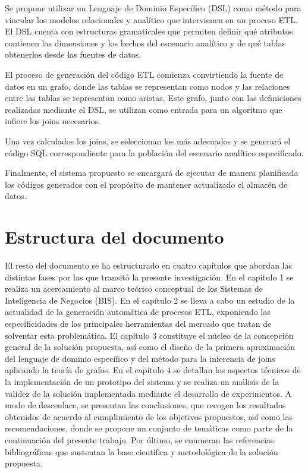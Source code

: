 Se propone utilizar un Lenguaje de Dominio Específico (DSL) como método para vincular los modelos relacionales y analítico
que intervienen en un proceso ETL. El DSL cuenta con estructuras gramaticales que permiten definir qu\'e atributos 
contienen las dimensiones y los hechos del escenario analítico y de qu\'e tablas obtenerlos desde las fuentes de datos.

El proceso de generación del c\'odigo ETL comienza convirtiendo la fuente de datos en un grafo, donde las tablas 
se representan como nodos y las relaciones entre las tablas se representan como aristas. Este grafo, junto con las 
definiciones realizadas mediante el DSL, se utilizan como entrada para un algoritmo que infiere los joins necesarios.

Una vez calculados los joins, se seleccionan los más adecuados y se generará el 
código SQL correspondiente para la población del escenario analítico especificado.

Finalmente, el sistema propuesto se encargará de ejecutar de manera planificada los códigos generados con el propósito de 
mantener actualizado el almacén de datos. 

\section{Estructura del documento}

El resto del documento se ha estructurado en cuatro capítulos que abordan las distintas fases por las que transitó la 
presente investigación. En el cap\'itulo 1 se realiza un acercamiento al marco te\'orico conceptual de los Sistemas de 
Inteligencia de Negocios (BIS). En el cap\'itulo 2 se lleva a cabo un estudio de la actualidad de la generaci\'on autom\'atica 
de procesos ETL, exponiendo las especificidades de las principales herramientas del mercado que tratan de solventar esta 
problem\'atica. El cap\'itulo 3 constituye el núcleo de la concepción general de la solución propuesta, así como el 
diseño de la primera aproximación del lenguaje de dominio específico y del método para la inferencia de joins 
aplicando la teoría de grafos. En el capítulo 4 se 
detallan los aspectos técnicos de la implementación de un prototipo del sistema y se realiza un análisis de la validez de 
la solución implementada mediante el desarrollo de experimentos. A modo de descenlace, se presentan las conclusiones,
que recogen los resultados obtenidos de acuerdo al cumplimiento de los objetivos propuestos, así como las recomendaciones, 
donde se propone un conjunto de temáticas como parte de la continuación del presente trabajo. Por último, se enumeran
las referencias bibliográficas que sustentan la base científica y metodológica de la solución propuesta.
